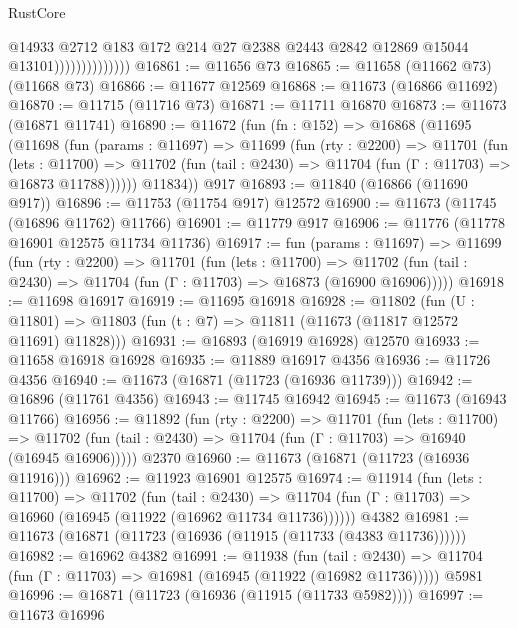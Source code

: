 \begin{lexlean}{RustCore}
\begin{coremodule}
                                @14933
                                @2712
                                @183
                                @172
                                @214
                                @27
                                @2388
                                @2443
                                @2842
                                @12869
                                @15044
                                @13101))))))))))))))
@16861 := @11656 @73
@16865 := @11658 (@11662 @73) (@11668 @73)
@16866 := @11677 @12569
@16868 := @11673 (@16866 @11692)
@16870 := @11715 (@11716 @73)
@16871 := @11711 @16870
@16873 := @11673 (@16871 @11741)
@16890 := @11672
    (fun (fn : @152) =>
    @16868
      (@11695
        (@11698
          (fun (params : @11697) =>
          @11699
            (fun (rty : @2200) =>
            @11701
              (fun (lets : @11700) =>
              @11702 (fun (tail : @2430) => @11704 (fun (Γ : @11703) => @16873 @11788))))))
        @11834))
    @917
@16893 := @11840 (@16866 (@11690 @917))
@16896 := @11753 (@11754 @917) @12572
@16900 := @11673 (@11745 (@16896 @11762) @11766)
@16901 := @11779 @917
@16906 := @11776 (@11778 @16901 @12575 @11734 @11736)
@16917 := fun (params : @11697) =>
  @11699
    (fun (rty : @2200) =>
    @11701
      (fun (lets : @11700) =>
      @11702 (fun (tail : @2430) => @11704 (fun (Γ : @11703) => @16873 (@16900 @16906)))))
@16918 := @11698 @16917
@16919 := @11695 @16918
@16928 := @11802
    (fun (U : @11801) => @11803 (fun (t : @7) => @11811 (@11673 (@11817 @12572 @11691) @11828)))
@16931 := @16893 (@16919 @16928) @12570
@16933 := @11658 @16918 @16928
@16935 := @11889 @16917 @4356
@16936 := @11726 @4356
@16940 := @11673 (@16871 (@11723 (@16936 @11739)))
@16942 := @16896 (@11761 @4356)
@16943 := @11745 @16942
@16945 := @11673 (@16943 @11766)
@16956 := @11892
    (fun (rty : @2200) =>
    @11701
      (fun (lets : @11700) =>
      @11702 (fun (tail : @2430) => @11704 (fun (Γ : @11703) => @16940 (@16945 @16906)))))
    @2370
@16960 := @11673 (@16871 (@11723 (@16936 @11916)))
@16962 := @11923 @16901 @12575
@16974 := @11914
    (fun (lets : @11700) =>
    @11702
      (fun (tail : @2430) =>
      @11704 (fun (Γ : @11703) => @16960 (@16945 (@11922 (@16962 @11734 @11736))))))
    @4382
@16981 := @11673 (@16871 (@11723 (@16936 (@11915 (@11733 (@4383 @11736))))))
@16982 := @16962 @4382
@16991 := @11938
    (fun (tail : @2430) => @11704 (fun (Γ : @11703) => @16981 (@16945 (@11922 (@16982 @11736)))))
    @5981
@16996 := @16871 (@11723 (@16936 (@11915 (@11733 @5982))))
@16997 := @11673 @16996

\end{coremodule}
\end{lexlean}
